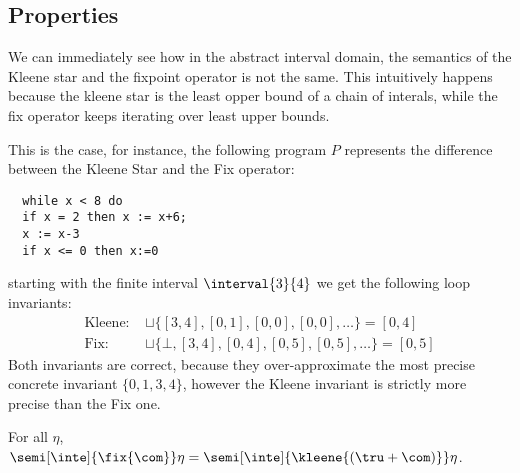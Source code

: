 \subsection{Properties}
\label{sub:intervalsprop}

We can immediately see how in the abstract interval domain, the
semantics of the Kleene star and the fixpoint operator is not the
same. This intuitively happens because the kleene star is the least
opper bound of a chain of interals, while the fix operator keeps
iterating over least upper bounds.

\begin{example} \label{ex:fix} This is the case, for instance, the
  following program \(P\) represents the difference between the Kleene
  Star and the Fix operator:
\begin{verbatim}
  while x < 8 do
  if x = 2 then x := x+6;
  x := x-3
  if x <= 0 then x:=0
\end{verbatim}
  starting with the finite interval \(\interval{3}{4}\) we get the
  following loop invariants:
  \begin{align*}
    \text{Kleene: } &\sqcup\{[3,4], [0,1], [0,0], [0,0], \ldots\} = [0,4]\\
    \text{Fix: } & \sqcup\{\bot, [3,4], [0,4], [0,5], [0,5],\ldots\} = [0,5]
  \end{align*}
  \noindent
  Both invariants are correct, because they over-approximate the most
  precise concrete invariant \(\{0,1,3,4\}\), however the Kleene
  invariant is strictly more precise than the Fix one.
\end{example}

\begin{lemma}\label{le:sugar}
  For all \(\eta\),
  \(\semi[\inte]{\fix{\com}} \eta = \semi[\inte]{\kleene{(\tru + \com)}} \eta\).
\end{lemma}

